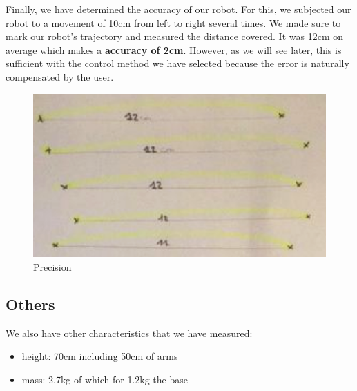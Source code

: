 Finally, we have determined the accuracy of our robot. For this, we subjected our robot to a movement of 10cm from left to right several times. We made sure to mark our robot's trajectory and measured the distance covered. It was 12cm on average which makes a \textbf{accuracy of 2cm}. However, as we will see later, this is sufficient with the control method we have selected because the error is naturally compensated by the user.
\begin{figure}[ht]
    \centering
    \includegraphics[scale=0.5]{Images/Section04/precision.png}
    \caption{Precision}
    \label{fig:Precision}
\end{figure}
\FloatBarrier

\subsection{Others}

We also have other characteristics that we have measured:
\begin{itemize}[noitemsep]
    \item height: 70cm including 50cm of arms
    \item mass: 2.7kg of which for 1.2kg the base
\end{itemize}
